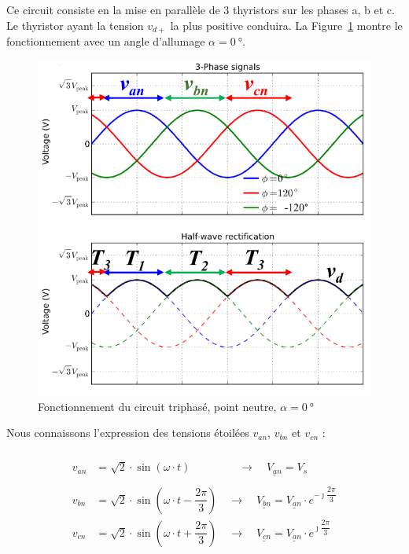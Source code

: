 \documentclass[a4paper, 11pt, openany, oneside, french]{article}
\begin{document}
Ce circuit consiste en la mise en parallèle de 3 thyristors sur les phases a, b et c. Le thyristor ayant la tension $v_{d+}$ la plus positive conduira. La Figure~\ref{fig:tri_wave} montre le fonctionnement avec un angle d'allumage $\alpha=\SI{0}{\degree}$.

\clearpage
\begin{figure}[!ht]
    \centering
    \includegraphics[width=0.8\linewidth]{tri_func}
    \caption{Fonctionnement du circuit triphasé, point neutre, $\alpha=\SI{0}{\degree}$}
    \label{fig:tri_wave}
\end{figure}

Nous connaissons l'expression des tensions étoilées $v_{an}$, $v_{bn}$ et $v_{cn}$ :

\begin{align*}
 v_{an} &= \sqrt{2} \cdot \sin{\left(\omega \cdot t\right)}\phantom{\left( ( \dfrac{2\pi}{3}\right)} \quad \rightarrow \quad \underline{V_{an}} = V_s\\
 v_{bn} &= \sqrt{2} \cdot \sin{\left(\omega \cdot t - \dfrac{2\pi}{3}\right)} \quad \rightarrow \quad \underline{V_{bn}} = \underline{V_{an}} \cdot e^{-\jmath \dfrac{2\pi}{3}}\\
 v_{cn} &= \sqrt{2} \cdot \sin{\left(\omega \cdot t + \dfrac{2\pi}{3}\right)} \quad \rightarrow \quad \underline{V_{cn}} = \underline{V_{an}} \cdot e^{\jmath \dfrac{2\pi}{3}}
 \end{align*}
 
\end{document}

